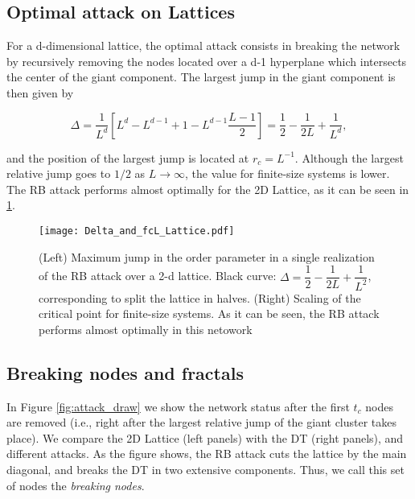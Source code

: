 \documentclass{article}
\begin{document}
\subsection{Optimal attack on Lattices} \label{sec:optimal_attack}

For a d-dimensional lattice, the optimal attack consists in breaking the network by recursively removing the nodes located over a d-1 hyperplane which intersects the center of the giant component. The largest jump in the giant component is then given by

\begin{equation}
\Delta = \dfrac{1}{L^d} \left[ L^d - L^{d-1} + 1 - L^{d-1} \dfrac{L-1}{2} \right] = \dfrac{1}{2} - \dfrac{1}{2L} + \dfrac{1}{L^d},
\end{equation}

and the position of the largest jump is located at $r_c = L^{-1}$. Although the largest relative jump goes to $1/2$ as $L\rightarrow \infty$, the value for finite-size systems is lower. The RB attack performs almost optimally for the 2D Lattice, as it can be seen in \ref{fig:Delta_Lattice}.

\begin{figure}
\centering
\texttt{[image: Delta\_and\_fcL\_Lattice.pdf]}
\caption{\label{fig:Delta_Lattice} (Left) Maximum jump in the order parameter in a single realization of the RB attack over a 2-d lattice. Black curve: $\Delta = \dfrac{1}{2}-\dfrac{1}{2L} + \dfrac{1}{L^2}$, corresponding to split the lattice in halves. (Right) Scaling of the critical point for finite-size systems. As it can be seen, the RB attack performs almost optimally in this netowork}
\end{figure}

\subsection{Breaking nodes and fractals}

In Figure \ref{fig:attack_draw} we show the network status after the first $t_c$ nodes are removed (i.e., right after the largest relative jump of the giant cluster takes place). We compare the 2D Lattice (left panels) with the DT (right panels), and different attacks. As the figure shows, the RB attack cuts the lattice by the main diagonal, and breaks the DT in two extensive components. Thus, we call this set of nodes the \emph{breaking nodes}. 
\end{document}
